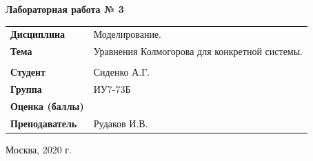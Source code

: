 \documentclass[a4paper,14pt]{extreport} %
\begin{document}
\begin{titlepage}
    \vspace{2cm}

    \begin{center}
        \textbf{Лабораторная работа № 3} \\
        \vspace{0.5cm}
    \end{center}

    \vspace{4cm}

    \begin{flushleft}
        \begin{tabular}{ll}
            \textbf{Дисциплина} & Моделирование.  \\
            \textbf{Тема} & Уравнения Колмогорова для конкретной системы.  \\
            \\
            \textbf{Студент} & Сиденко А.Г. \\
            \textbf{Группа} & ИУ7-73Б \\
            \textbf{Оценка (баллы)} & \\
            \textbf{Преподаватель} & Рудаков И.В.   \\
        \end{tabular}
    \end{flushleft}

    \vspace{4cm}

   \begin{center}
        Москва, 2020 г.
    \end{center}

\end{titlepage}
\end{document}
